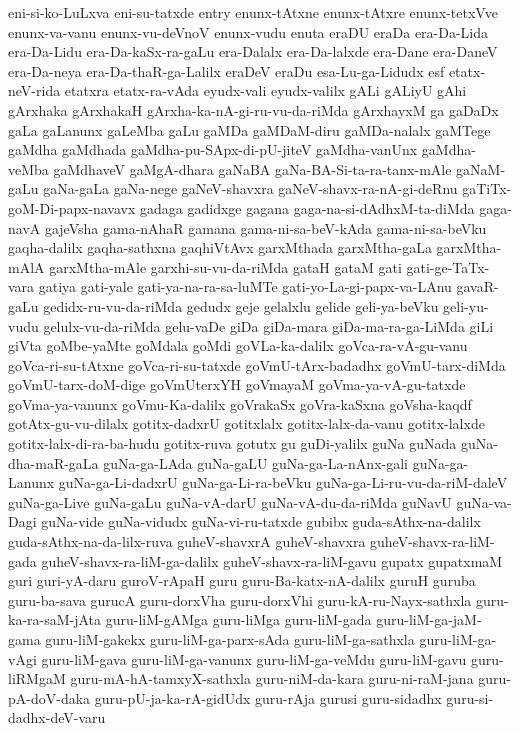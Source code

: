 {eni-si-ko-LuLxva
eni-su-tatxde
entry
enunx-tAtxne
enunx-tAtxre
enunx-tetxVve
enunx-va-vanu
enunx-vu-deVnoV
enunx-vudu
enuta
eraDU
eraDa
era-Da-Lida
era-Da-Lidu
era-Da-kaSx-ra-gaLu
era-Dalalx
era-Da-lalxde
era-Dane
era-DaneV
era-Da-neya
era-Da-thaR-ga-Lalilx
eraDeV
eraDu
esa-Lu-ga-Lidudx
esf
etatx-neV-rida
etatxra
etatx-ra-vAda
eyudx-vali
eyudx-valilx
gALi
gALiyU
gAhi
gArxhaka
gArxhakaH
gArxha-ka-nA-gi-ru-vu-da-riMda
gArxhayxM
ga
gaDaDx
gaLa
gaLanunx
gaLeMba
gaLu
gaMDa
gaMDaM-diru
gaMDa-nalalx
gaMTege
gaMdha
gaMdhada
gaMdha-pu-SApx-di-pU-jiteV
gaMdha-vanUnx
gaMdha-veMba
gaMdhaveV
gaMgA-dhara
gaNaBA
gaNa-BA-Si-ta-ra-tanx-mAle
gaNaM-gaLu
gaNa-gaLa
gaNa-nege
gaNeV-shavxra
gaNeV-shavx-ra-nA-gi-deRnu
gaTiTx-goM-Di-papx-navavx
gadaga
gadidxge
gagana
gaga-na-si-dAdhxM-ta-diMda
gaga-navA
gajeVsha
gama-nAhaR
gamana
gama-ni-sa-beV-kAda
gama-ni-sa-beVku
gaqha-dalilx
gaqha-sathxna
gaqhiVtAvx
garxMthada
garxMtha-gaLa
garxMtha-mAlA
garxMtha-mAle
garxhi-su-vu-da-riMda
gataH
gataM
gati
gati-ge-TaTx-vara
gatiya
gati-yale
gati-ya-na-ra-sa-luMTe
gati-yo-La-gi-papx-va-LAnu
gavaR-gaLu
gedidx-ru-vu-da-riMda
gedudx
geje
gelalxlu
gelide
geli-ya-beVku
geli-yu-vudu
gelulx-vu-da-riMda
gelu-vaDe
giDa
giDa-mara
giDa-ma-ra-ga-LiMda
giLi
giVta
goMbe-yaMte
goMdala
goMdi
goVLa-ka-dalilx
goVca-ra-vA-gu-vanu
goVca-ri-su-tAtxne
goVca-ri-su-tatxde
goVmU-tArx-badadhx
goVmU-tarx-diMda
goVmU-tarx-doM-dige
goVmUterxYH
goVmayaM
goVma-ya-vA-gu-tatxde
goVma-ya-vanunx
goVmu-Ka-dalilx
goVrakaSx
goVra-kaSxna
goVsha-kaqdf
gotAtx-gu-vu-dilalx
gotitx-dadxrU
gotitxlalx
gotitx-lalx-da-vanu
gotitx-lalxde
gotitx-lalx-di-ra-ba-hudu
gotitx-ruva
gotutx
gu
guDi-yalilx
guNa
guNada
guNa-dha-maR-gaLa
guNa-ga-LAda
guNa-gaLU
guNa-ga-La-nAnx-gali
guNa-ga-Lanunx
guNa-ga-Li-dadxrU
guNa-ga-Li-ra-beVku
guNa-ga-Li-ru-vu-da-riM-daleV
guNa-ga-Live
guNa-gaLu
guNa-vA-darU
guNa-vA-du-da-riMda
guNavU
guNa-va-Dagi
guNa-vide
guNa-vidudx
guNa-vi-ru-tatxde
gubibx
guda-sAthx-na-dalilx
guda-sAthx-na-da-lilx-ruva
guheV-shavxrA
guheV-shavxra
guheV-shavx-ra-liM-gada
guheV-shavx-ra-liM-ga-dalilx
guheV-shavx-ra-liM-gavu
gupatx
gupatxmaM
guri
guri-yA-daru
guroV-rApaH
guru
guru-Ba-katx-nA-dalilx
guruH
guruba
guru-ba-sava
gurucA
guru-dorxVha
guru-dorxVhi
guru-kA-ru-Nayx-sathxla
guru-ka-ra-saM-jAta
guru-liM-gAMga
guru-liMga
guru-liM-gada
guru-liM-ga-jaM-gama
guru-liM-gakekx
guru-liM-ga-parx-sAda
guru-liM-ga-sathxla
guru-liM-ga-vAgi
guru-liM-gava
guru-liM-ga-vanunx
guru-liM-ga-veMdu
guru-liM-gavu
guru-liRMgaM
guru-mA-hA-tamxyX-sathxla
guru-niM-da-kara
guru-ni-raM-jana
guru-pA-doV-daka
guru-pU-ja-ka-rA-gidUdx
guru-rAja
gurusi
guru-sidadhx
guru-si-dadhx-deV-varu
}
